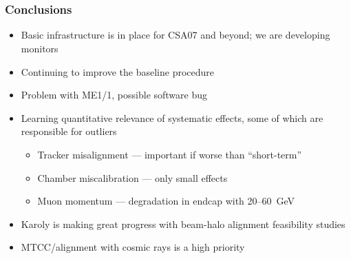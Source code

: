 \documentclass[compress]{beamer}
\begin{document}

\section*{}

\begin{frame}
\frametitle{Conclusions}
\begin{itemize}\setlength{\itemsep}{0.2 cm}
\item Basic infrastructure is in place for CSA07 and beyond; we are developing monitors

\item Continuing to improve the baseline procedure

\item Problem with ME1/1, possible software bug

\item Learning quantitative relevance of systematic effects, some
of which are responsible for outliers

\vspace{0.1 cm}
\begin{itemize}\setlength{\itemsep}{0.2 cm}
\item Tracker misalignment --- important if worse than ``short-term''
\item Chamber miscalibration --- only small effects
\item Muon momentum --- degradation in endcap with 20--60~GeV
\end{itemize}

\item Karoly is making great progress with beam-halo alignment feasibility studies

\item MTCC/alignment with cosmic rays is a high priority
\end{itemize}

\label{numpages}
\end{frame}
\end{document}
